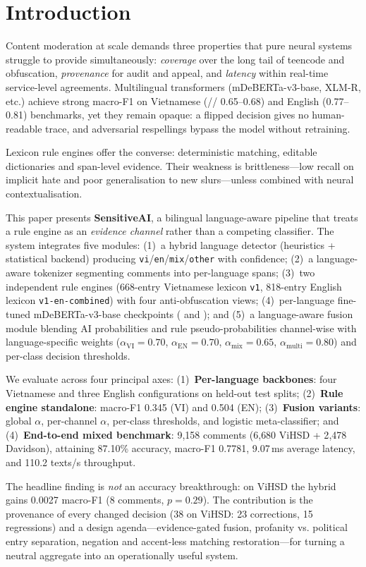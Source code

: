\section{Introduction}
\label{sec:introduction}

Content moderation at scale demands three properties that pure neural systems
struggle to provide simultaneously: \emph{coverage} over the long tail of
teencode and obfuscation, \emph{provenance} for audit and appeal, and
\emph{latency} within real-time service-level agreements.  Multilingual
transformers (mDeBERTa-v3-base, XLM-R, etc.) achieve strong macro-F1 on
Vietnamese (\hate{}/\off{}/\clean{} 0.65–0.68) and English (0.77–0.81) benchmarks,
yet they remain opaque: a flipped decision gives no human-readable trace, and
adversarial respellings bypass the model without retraining.

Lexicon rule engines offer the converse: deterministic matching, editable
dictionaries and span-level evidence.  Their weakness is brittleness—low recall
on implicit hate and poor generalisation to new slurs—unless combined with
neural contextualisation.

This paper presents \textbf{SensitiveAI}, a bilingual language-aware pipeline
that treats a rule engine as an \emph{evidence channel} rather than a competing
classifier.  The system integrates five modules:
(1)~a hybrid language detector (heuristics + statistical backend) producing \texttt{vi}/\texttt{en}/\texttt{mix}/\texttt{other} with confidence;
(2)~a language-aware tokenizer segmenting comments into per-language spans;
(3)~two independent rule engines (668-entry Vietnamese lexicon \texttt{v1}, 818-entry English lexicon \texttt{v1-en-combined}) with four anti-obfuscation views;
(4)~per-language fine-tuned mDeBERTa-v3-base checkpoints ( and ); and
(5)~a language-aware fusion module blending AI probabilities and rule pseudo-probabilities channel-wise with language-specific weights ($\alpha_{\text{VI}}=0.70$, $\alpha_{\text{EN}}=0.70$, $\alpha_{\text{mix}}=0.65$, $\alpha_{\text{multi}}=0.80$) and per-class decision thresholds.

We evaluate across four principal axes:
(1)~\textbf{Per-language backbones}: four Vietnamese and three English configurations on held-out test splits;
(2)~\textbf{Rule engine standalone}: macro-F1 0.345 (VI) and 0.504 (EN);
(3)~\textbf{Fusion variants}: global $\alpha$, per-channel $\alpha$, per-class thresholds, and logistic meta-classifier; and
(4)~\textbf{End-to-end mixed benchmark}: 9{,}158 comments (6{,}680 ViHSD + 2{,}478 Davidson), attaining 87.10\% accuracy, macro-F1 0.7781, 9.07\,ms average latency, and 110.2 texts/s throughput.

The headline finding is \emph{not} an accuracy breakthrough: on ViHSD the
hybrid gains 0.0027 macro-F1 (8 comments, $p=0.29$).  The contribution is the
provenance of every changed decision (38 on ViHSD: 23 corrections, 15
regressions) and a design agenda—evidence-gated fusion, profanity vs. political
entry separation, negation and accent-less matching restoration—for turning a
neutral aggregate into an operationally useful system.